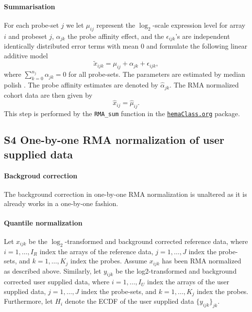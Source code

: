 \documentclass[10pt,letterpaper]{article}
\newcommand{\hemaClass}{\href{http://hemaClass.org}{\texttt{hemaClass.org}}}
\begin{document}
\paragraph{Summarisation}
For each probe-set $j$ we let $\mu_{ij}$ represent the $\log_2$-scale expression level for array $i$ and probeset $j$, $\alpha_{jk}$ the probe affinity effect, and the $\epsilon_{ijk}$'s are independent identically distributed  error terms with mean 0 and formulate the following linear additive model
\begin{equation*}
   \tilde{x}_{ijk} = \mu_{ij} + \alpha_{jk}+ \epsilon_{ijk},
\end{equation*}
where $\sum_{k=0}^{n_j} \alpha_{jk} = 0$ for all probe-sets. The parameters are estimated by median polish \cite{Holder2001}. The probe affinity estimates are denoted by $\hat{\alpha}_{jk}$. The RMA normalized cohort data are then given by
\begin{equation*}
   \hat{x}_{ij} = \hat{\mu}_{ij}.
\end{equation*}
This step is performed by the \texttt{RMA\_sum} function in the \hemaClass{} package.


\subsection*{S4 One-by-one RMA normalization of user supplied data}
\paragraph{Backgroud correction}
The background correction in one-by-one RMA normalization is unaltered as it is already works in a one-by-one fashion.

\paragraph{Quantile normalization}
Let $x_{ijk}$ be the $\log_2$-transformed and background corrected reference data, where $i = 1,\dots,I_R$ index the arrays of the reference data, $j=1,\dots,J$ index the probe-sets, and $k=1,\dots,K_j$ index the probes. Assume $x_{ijk}$ has been RMA normalized as described above. Similarly, let $y_{ijk}$ be the log2-transformed and background corrected user supplied data, where $i = 1,\dots,I_U$ index the arrays of the user supplied data, $j=1,\dots,J$  index the probe-sets, and $k=1,\dots,K_j$ index the probes. Furthermore, let $H_i$ denote the ECDF of the user supplied data $\{y_{ijk}\}_{jk}$.
\end{document}
